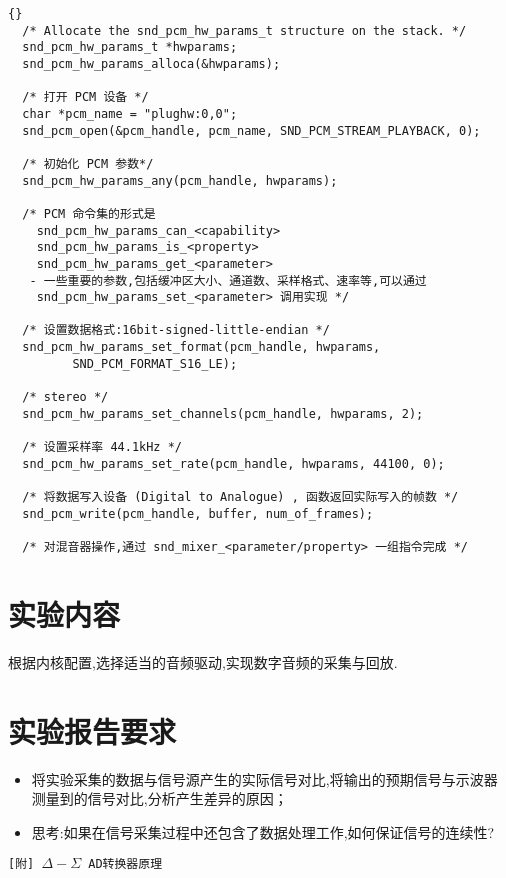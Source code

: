 \lstset{language=c}
\begin{lstlisting}{}
  /* Allocate the snd_pcm_hw_params_t structure on the stack. */
  snd_pcm_hw_params_t *hwparams;
  snd_pcm_hw_params_alloca(&hwparams);
  
  /* 打开 PCM 设备 */
  char *pcm_name = "plughw:0,0";
  snd_pcm_open(&pcm_handle, pcm_name, SND_PCM_STREAM_PLAYBACK, 0);
  
  /* 初始化 PCM 参数*/
  snd_pcm_hw_params_any(pcm_handle, hwparams);
  
  /* PCM 命令集的形式是
  	snd_pcm_hw_params_can_<capability>
  	snd_pcm_hw_params_is_<property>
  	snd_pcm_hw_params_get_<parameter>
   - 一些重要的参数,包括缓冲区大小、通道数、采样格式、速率等,可以通过
  	snd_pcm_hw_params_set_<parameter> 调用实现 */
  
  /* 设置数据格式:16bit-signed-little-endian */
  snd_pcm_hw_params_set_format(pcm_handle, hwparams,
         SND_PCM_FORMAT_S16_LE);
  
  /* stereo */ 
  snd_pcm_hw_params_set_channels(pcm_handle, hwparams, 2);
  
  /* 设置采样率 44.1kHz */
  snd_pcm_hw_params_set_rate(pcm_handle, hwparams, 44100, 0);
  
  /* 将数据写入设备 (Digital to Analogue) , 函数返回实际写入的帧数 */
  snd_pcm_write(pcm_handle, buffer, num_of_frames);
  
  /* 对混音器操作,通过 snd_mixer_<parameter/property> 一组指令完成 */
\end{lstlisting}


\section{实验内容}

	根据内核配置,选择适当的音频驱动,实现数字音频的采集与回放.

\section{实验报告要求}
\begin{itemize}\itemsep=-3pt
  \item 将实验采集的数据与信号源产生的实际信号对比,将输出的预期信号与示波器
		测量到的信号对比,分析产生差异的原因；
  \item 思考:如果在信号采集过程中还包含了数据处理工作,如何保证信号的连续性?
\end{itemize}

\newpage
\tt [附] $\Delta-\Sigma$ AD转换器原理

